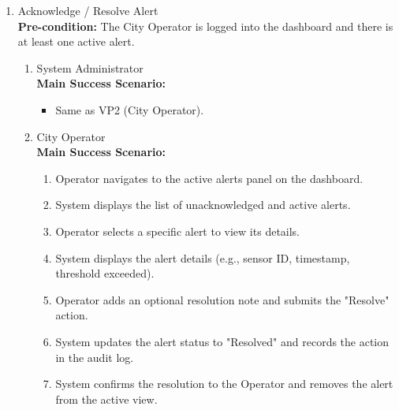 {\begin{enumerate}[{\bf BE1.}]
	\item Acknowledge / Resolve Alert \\
    {\bf Pre-condition:} The City Operator is logged into the dashboard and there is at least one active alert.
    \begin{enumerate}[{\bf VP1.}]
        \item System Administrator \\
            {\bf Main Success Scenario:}
                \begin{itemize}
                    \item Same as VP2 (City Operator).
                \end{itemize}
        \item City Operator \\
            {\bf Main Success Scenario:}
                \begin{enumerate}[1. ]
                    \item Operator navigates to the active alerts panel on the dashboard.
                    \item System displays the list of unacknowledged and active alerts.
                    \item Operator selects a specific alert to view its details.
                    \item System displays the alert details (e.g., sensor ID, timestamp, threshold exceeded).
                    \item Operator adds an optional resolution note and submits the "Resolve" action.
                    \item System updates the alert status to "Resolved" and records the action in the audit log.
                    \item System confirms the resolution to the Operator and removes the alert from the active view.
                \end{enumerate}


\end{enumerate}
\end{enumerate}}
